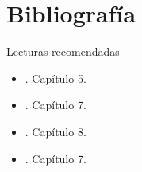 \documentclass[9pt, aspectratio=169]{beamer}
\begin{document}
\section*{Bibliografía}
\begin{frame}[allowframebreaks]{Lecturas recomendadas}
\begin{itemize}
    \item {}. Capítulo 5.
    \item {}. Capítulo 7.
    \item {}. Capítulo 8.
    \item {}. Capítulo 7.
\end{itemize}
\end{frame}
\end{document}
